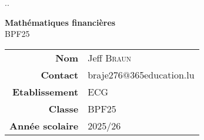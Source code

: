 \documentclass[a4paper, 11pt, oneside, BCOR=0mm, DIV=15]{scrbook} %
\makeatletter
\def\lycee{ECG}
\def\classe{BPF25}
\def\season{2025/26}
\def\email{braje276$@$365education.lu}
\def\name{Jeff {\scshape Braun}}
\makeatother
\begin{document}
\thispagestyle{empty}
{\color{white}.\hfill.}
\vspace{5cm}

\begin{center}
\huge
{\bfseries Mathématiques financières} \\
BPF25
\end{center}

\vfill

\large
\begin{center}
\begin{tabular}{r|l}
\textbf{Nom}
 & \name \\
\textbf{Contact}
 & \email \\
\textbf{Etablissement}
 & {\scshape \lycee} \\
\textbf{Classe}
 & {\scshape \classe} \\
\textbf{Année scolaire}
 & {\scshape \season}
\end{tabular}
\end{center}


\clearpage




%
%
%
%
%
\end{document}
